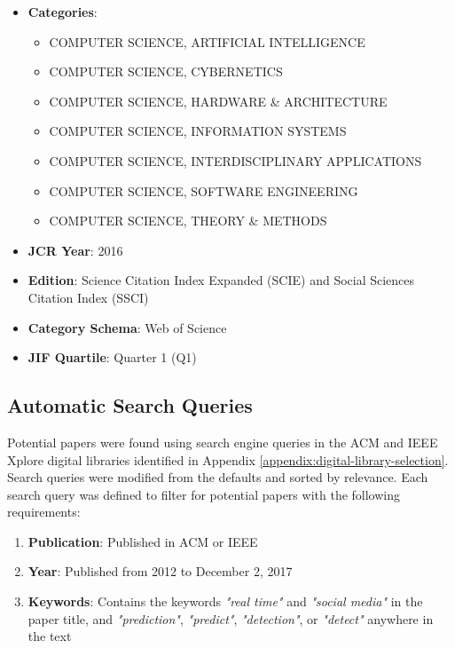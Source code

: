 \begin{itemize}
  \item \textbf{Categories}:
	\begin{itemize}
		\item COMPUTER SCIENCE, ARTIFICIAL INTELLIGENCE
		\item COMPUTER SCIENCE, CYBERNETICS
		\item COMPUTER SCIENCE, HARDWARE \& ARCHITECTURE
		\item COMPUTER SCIENCE, INFORMATION SYSTEMS
		\item COMPUTER SCIENCE, INTERDISCIPLINARY APPLICATIONS
		\item COMPUTER SCIENCE, SOFTWARE ENGINEERING
		\item COMPUTER SCIENCE, THEORY \& METHODS
	\end{itemize}
  \item \textbf{JCR Year}: 2016
  \item \textbf{Edition}: Science Citation Index Expanded (SCIE) \cite{Garfield:2006a} and Social Sciences Citation Index (SSCI) \cite{Klein:2004}
  \item \textbf{Category Schema}: Web of Science \cite{Clarivate:2017b}
  \item \textbf{JIF Quartile}: Quarter 1 (Q1)
\end{itemize}

\subsection{Automatic Search Queries} \label{appendix:automatic-search-queries}

Potential papers were found using search engine queries in the ACM \cite{ACM:2017} and IEEE Xplore \cite{IEEE:2017} digital libraries identified in Appendix \ref{appendix:digital-library-selection}. Search queries were modified from the defaults and sorted by relevance. Each search query was defined to filter for potential papers with the following requirements:

\begin{enumerate}[label=(\alph*)]
	\item \textbf{Publication}: Published in ACM or IEEE
	\item \textbf{Year}: Published from 2012 to December 2, 2017
	\item \textbf{Keywords}: Contains the keywords \textit{"real time"} and \textit{"social media"} in the paper title, and \textit{"prediction"}, \textit{"predict"}, \textit{"detection"}, or \textit{"detect"} anywhere in the text
\end{enumerate}

